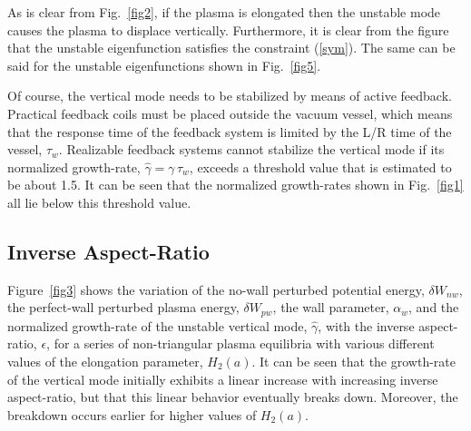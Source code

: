 \documentclass[12pt,prb,aps]{revtex4-1}
\begin{document}
 As is clear from Fig.~\ref{fig2}, if the plasma is  elongated then the unstable mode causes the
plasma to displace vertically. Furthermore, it is clear from the figure that the unstable eigenfunction satisfies the constraint (\ref{sym}).  The same can be
said for the unstable eigenfunctions shown in Fig.~\ref{fig5}.

Of course, the vertical mode needs to be stabilized by means of active feedback. Practical feedback coils must be
placed outside the vacuum vessel, which means that the response time of the feedback system is limited by the L/R time of the vessel, $\tau_w$.  Realizable feedback
systems cannot stabilize the vertical mode if its normalized growth-rate, $\hat{\gamma}=\gamma\,\tau_w$, exceeds a threshold value that is estimated to be about
1.5.\cite{f2} It can be seen that the normalized growth-rates shown in Fig.~\ref{fig1} all lie below this threshold value. 

\subsection{Inverse Aspect-Ratio}
Figure~\ref{fig3} shows the variation of the no-wall perturbed potential energy, $\delta W_{nw}$, the perfect-wall perturbed plasma energy, $\delta W_{pw}$, the wall 
parameter, $\alpha_w$, and the normalized growth-rate of the unstable vertical mode, $\hat{\gamma}$, with the inverse
aspect-ratio, $\epsilon$, for a series of
non-triangular plasma equilibria with various different values of the elongation parameter, $H_2(a)$. It can be seen that the growth-rate of the vertical 
mode initially exhibits a linear increase with increasing inverse aspect-ratio, but that this linear behavior eventually breaks down. Moreover, the breakdown occurs
earlier for higher values of $H_2(a)$. 
\end{document}
